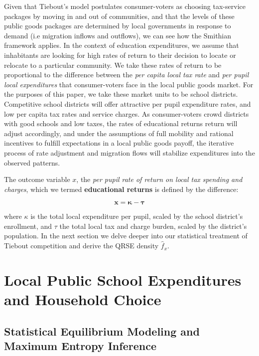 Given that Tiebout's model postulates consumer-voters as choosing
tax-service packages by moving in and out of communities, and that the
levels of these public goods packages are determined by local
governments in response to demand (i.e migration inflows and
outflows), we can see how the Smithian framework applies. In the
context of education expenditures, we assume that inhabitants are
looking for high rates of return to their decision to locate or
relocate to a particular community. We take these rates of return to
be proportional to the difference between the \emph{per capita local tax
rate} and \emph{per pupil local expenditures} that consumer-voters face in
the local public goods market.  For the purposes of this paper, we
take these market units to be school districts. Competitive school
districts will offer attractive per pupil expenditure rates, and low
per capita tax rates and service charges.  As consumer-voters crowd
districts with good schools and low taxes, the rates of educational
returns return will adjust accordingly, and under the assumptions of
full mobility and rational incentives to fulfill expectations in a
local public goods payoff, the iterative process of rate adjustment
and migration flows will stabilize expenditures into the observed
patterns.


The outcome variable $x$, the \emph{per pupil rate of return on local tax
spending and charges}, which we termed \textbf{educational returns} is
defined by the difference:

\medskip

\[ \mathbf{x = \kappa - \tau } \]

\medskip


where $\kappa$ is the total local expenditure per pupil, scaled by the
school district's enrollment, and $\tau$ the total local tax and
charge burden, scaled by the district's population. In the next
section we delve deeper into our statistical treatment of Tiebout
competition and derive the QRSE density $\hat{f}_{x}$.


\section{Local Public School Expenditures and Household Choice}
\label{sec-4}

\subsection{Statistical Equilibrium Modeling and Maximum Entropy Inference}
\label{sec-4-1}

